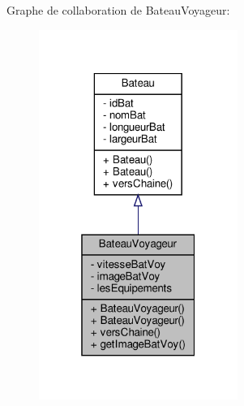 Graphe de collaboration de Bateau\+Voyageur\+:\nopagebreak
\begin{figure}[H]
\begin{center}
\leavevmode
\includegraphics[width=184pt]{class_bateau_voyageur__coll__graph}
\end{center}
\end{figure}
